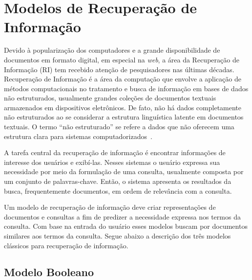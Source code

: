 
\section{Modelos de Recuperação de Informação}


Devido à popularização dos computadores e a grande disponibilidade de documentos em formato digital, em especial na \textit{web}, a área da Recuperação de Informação (RI) tem recebido atenção de pesquisadores nas últimas décadas. Recuperação de Informação é a área da computação que envolve a aplicação de métodos computacionais no tratamento e busca de informação em bases de dados não estruturados, usualmente grandes coleções de documentos textuais armazenados em dispositivos eletrônicos. De fato, não há dados completamente não estruturados ao se considerar a estrutura linguística latente em documentos textuais. O termo ``não estruturado'' se refere a dados que não oferecem uma estrutura clara para sistemas computadorizados~\cite{Manning2008, Gutierrez2016}.


A tarefa central da recuperação de informação é encontrar informações de interesse dos usuários e exibí-las. 
Nesses sistemas o usuário expressa sua necessidade por meio da formulação de uma consulta, usualmente composta por um conjunto de palavras-chave. Então, o sistema apresenta os resultados da busca, frequentemente documentos, em ordem de relevância com a consulta.  %



Um modelo de recuperação de informação deve criar representações de documentos e consultas a fim de predizer a necessidade expressa nos termos da consulta. Com base na entrada do usuário esses modelos buscam por documentos similares aos termos da consulta. Segue abaixo a descrição dos três modelos clássicos para recuperação de informação.

\subsection{Modelo Booleano}

